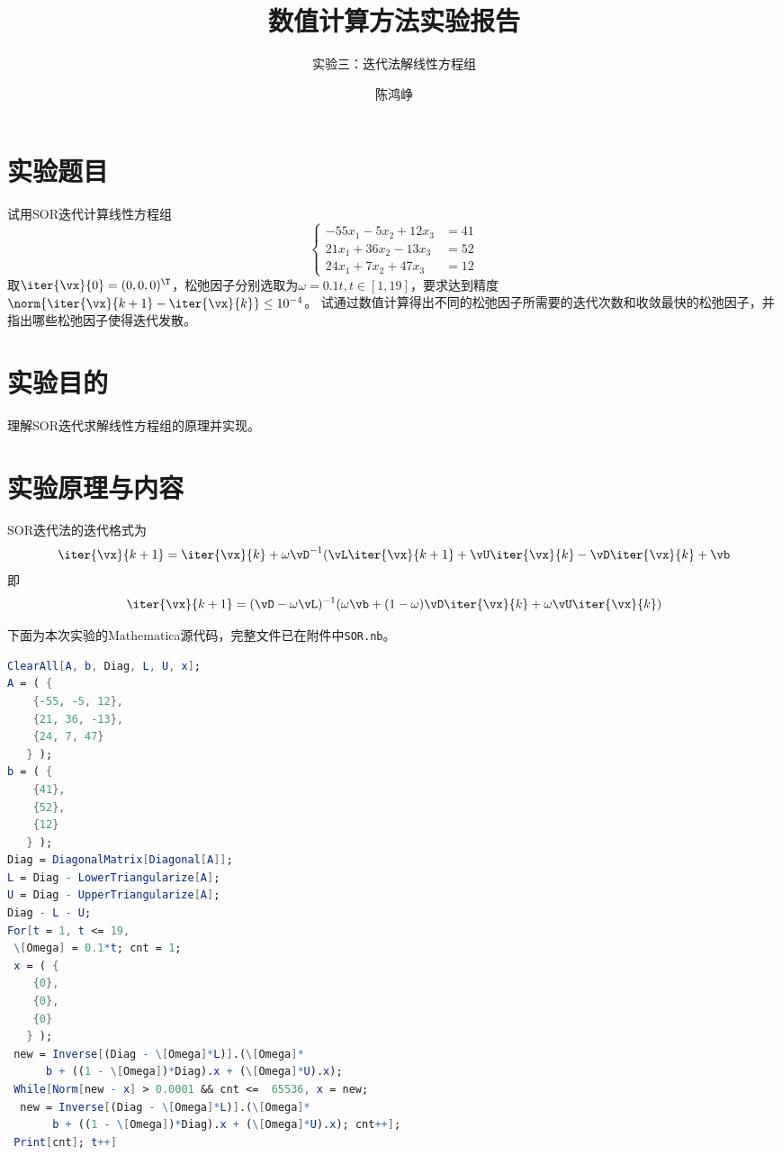 \documentclass[reportComp]{thesis}
\title{数值计算方法实验报告}
\subtitle{实验三：迭代法解线性方程组}
\author{陈鸿峥}
\begin{document}
\maketitle

\section{实验题目}
试用SOR迭代计算线性方程组
\[\begin{cases}
-55x_1  -5x_2  +12x_3 & =41\\
21x_1  +36x_2  -13x_3 & =52\\
24x_1  +7x_2  +47x_3 &=12
\end{cases}\]
取$\iter{\vx}{0}=(0,0,0)^\T$，松弛因子分别选取为$\omega=0.1t,t\in[1,19]$，要求达到精度$\norm{\iter{\vx}{k+1}-\iter{\vx}{k}}\leq 10^{-4}$。
试通过数值计算得出不同的松弛因子所需要的迭代次数和收敛最快的松弛因子，并指出哪些松弛因子使得迭代发散。

\section{实验目的}
理解SOR迭代求解线性方程组的原理并实现。

\section{实验原理与内容}
SOR迭代法的迭代格式为
\[\iter{\vx}{k+1}=\iter{\vx}{k}+\omega\vD^{-1}(\vL\iter{\vx}{k+1}+\vU\iter{\vx}{k}-\vD\iter{\vx}{k}+\vb\]
即
\[\iter{\vx}{k+1}=(\vD-\omega\vL)^{-1}(\omega\vb+(1-\omega)\vD\iter{\vx}{k}+\omega\vU\iter{\vx}{k})\]

下面为本次实验的Mathematica源代码，完整文件已在附件中\verb'SOR.nb'。
\begin{lstlisting}[language=mathematica]
ClearAll[A, b, Diag, L, U, x];
A = ( {
    {-55, -5, 12},
    {21, 36, -13},
    {24, 7, 47}
   } );
b = ( {
    {41},
    {52},
    {12}
   } );
Diag = DiagonalMatrix[Diagonal[A]];
L = Diag - LowerTriangularize[A];
U = Diag - UpperTriangularize[A];
Diag - L - U;
For[t = 1, t <= 19,
 \[Omega] = 0.1*t; cnt = 1;
 x = ( {
    {0},
    {0},
    {0}
   } );
 new = Inverse[(Diag - \[Omega]*L)].(\[Omega]*
      b + ((1 - \[Omega])*Diag).x + (\[Omega]*U).x);
 While[Norm[new - x] > 0.0001 && cnt <=  65536, x = new; 
  new = Inverse[(Diag - \[Omega]*L)].(\[Omega]*
       b + ((1 - \[Omega])*Diag).x + (\[Omega]*U).x); cnt++];
 Print[cnt]; t++]
\end{lstlisting}
\end{document}
